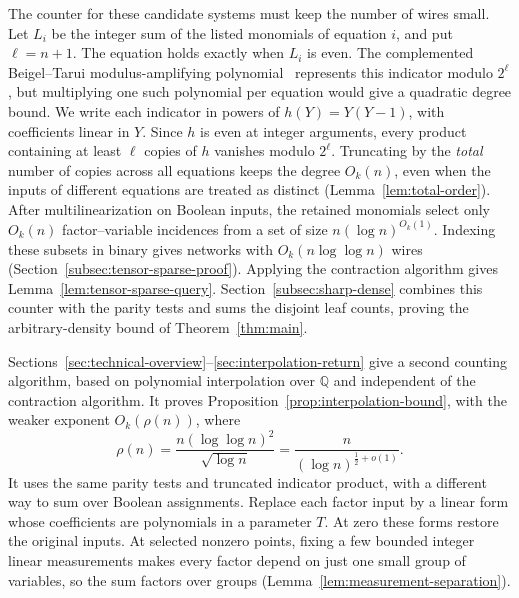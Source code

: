 \documentclass[11pt,reqno]{amsart}
\numberwithin{equation}{section}
\theoremstyle{definition}\newtheorem{definition}[theorem]{Definition}
\theoremstyle{remark}\newtheorem{remark}[theorem]{Remark}
\begin{document}
The counter for these candidate systems must keep the number of
wires small. Let $L_i$ be the integer sum of the listed monomials
of equation $i$, and put $\ell=n+1$. The equation holds exactly when
$L_i$ is even. The complemented Beigel--Tarui modulus-amplifying
polynomial~\cite[Section~2.3]{BT94} represents this indicator modulo
$2^\ell$, but multiplying one such polynomial per equation would
give a quadratic degree bound. We write each indicator in powers
of $h(Y)=Y(Y-1)$, with coefficients linear in $Y$. Since $h$ is
even at integer arguments, every product containing at least
$\ell$ copies of $h$ vanishes modulo $2^\ell$. Truncating by the
\emph{total} number of copies across all equations keeps the degree
$O_k(n)$, even when the inputs of different equations are treated
as distinct (Lemma~\ref{lem:total-order}). After multilinearization
on Boolean inputs, the retained monomials select only $O_k(n)$
factor--variable incidences from a set of size
$n(\log n)^{O_k(1)}$. Indexing these subsets in binary
gives networks with $O_k(n\log\log n)$ wires
(Section~\ref{subsec:tensor-sparse-proof}). Applying the contraction
algorithm gives Lemma~\ref{lem:tensor-sparse-query}.
Section~\ref{subsec:sharp-dense} combines this counter with the parity
tests and sums the disjoint leaf counts, proving the arbitrary-density
bound of Theorem~\ref{thm:main}.

Sections~\ref{sec:technical-overview}--\ref{sec:interpolation-return}
give a second counting algorithm, based on polynomial interpolation over $\mathbb Q$ and
independent of the contraction algorithm. It proves
Proposition~\ref{prop:interpolation-bound}, with the weaker exponent
$O_k(\rho(n))$, where
\[
 \rho(n)=\frac{n(\log\log n)^2}{\sqrt{\log n}}
          =\frac{n}{(\log n)^{\frac12+o(1)}}.
\]
It uses the same parity tests and truncated indicator product, with
a different way to sum over Boolean assignments. Replace each factor
input by a linear form whose coefficients are polynomials in a
parameter $T$. At zero these forms restore the original inputs.
At selected nonzero points, fixing a few bounded integer linear
measurements makes every factor depend on just one small group of
variables, so the sum factors over groups
(Lemma~\ref{lem:measurement-separation}).
\end{document}
